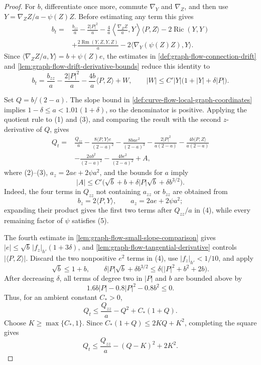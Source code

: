 \begin{proof}
For $b$, differentiate once more, commute $\nabla_Y$ and $\nabla_Z$, and
then use $Y=\nabla_ZZ/a-\psi(Z)Z$.  Before estimating any term this gives
\begin{align*}
 b_t={}&\frac{b_{zz}}a-\frac{2|P|^2}a
 -\frac4a\left\langle\frac{\nabla_ZZ}{a},Y\right\rangle
             \langle P,Z\rangle
 -2\operatorname{Ric}(Y,Y)\\
 &+\frac{2\operatorname{Rm}(Y,Z,Y,Z)}a
 -2\langle\nabla_Y(\psi(Z)Z),Y\rangle.
\end{align*}
Since
$\langle\nabla_ZZ/a,Y\rangle=b+\psi(Z)e$, the estimates in
\ref{def:graph-flow-connection-drift} and
\ref{lem:graph-flow-drift-derivative-bounds} reduce this identity to
\[
b_t=\frac{b_{zz}}a-\frac{2|P|^2}a
       -\frac{4b}{a}\langle P,Z\rangle+W,
 \qquad
 |W|\le C'|Y|\bigl(1+|Y|+\delta|P|\bigr).           \tag{3}
\]

Set $Q=b/(2-a)$.  The slope bound in
\ref{def:curve-flow-local-graph-coordinates} implies
$1-\delta\le a<1.01(1+\delta)$, so the denominator is positive.  Applying
the quotient rule to (1) and (3), and comparing the result with the second
$z$-derivative of $Q$, gives
\begin{align*}
 Q_t={}&\frac{Q_{zz}}a
 -\frac{8\langle P,Y\rangle e}{(2-a)^2}
 -\frac{8ba e^2}{(2-a)^3}
 -\frac{2|P|^2}{a(2-a)}
 -\frac{4b\langle P,Z\rangle}{a(2-a)}\\
 &-\frac{2ab^2}{(2-a)^2}
 -\frac{4be^2}{(2-a)^2}+A,                          \tag{4}
\end{align*}
where (2)--(3), $a_z=2ae+2\psi a^2$, and the bounds for $a$ imply
\[
|A|\le C'\bigl(\sqrt b+b+\delta |P|\sqrt b+\delta b^{3/2}\bigr).\tag{5}
\]
Indeed, the four terms in $Q_{zz}$ not containing $a_{zz}$ or $b_{zz}$
are obtained from
\[
 b_z=2\langle P,Y\rangle,
 \qquad a_z=2ae+2\psi a^2;
\]
expanding their product gives the first two terms after $Q_{zz}/a$ in
(4), while every remaining factor of $\psi$ satisfies (5).

The fourth estimate in \ref{lem:graph-flow-small-slope-comparison} gives
$|e|\le\sqrt b\,|f_z|_{h'}(1+3\delta)$, and
\ref{lem:graph-flow-tangential-derivative} controls
$|\langle P,Z\rangle|$.  Discard the two nonpositive $e^2$ terms in
(4), use $|f_z|_{h'}<1/10$, and apply
\[
\sqrt b\le 1+b,
 \qquad
\delta |P|\sqrt b+\delta b^{3/2}
 \le \delta\bigl(|P|^2+b^2+2b\bigr).
\]
After decreasing $\delta$, all terms of degree two in $|P|$ and $b$ are
bounded above by
\[
 1.6b|P|-0.8|P|^2-0.8b^2\le0.
\]
Thus, for an ambient constant $C_*>0$,
\[
 Q_t\le\frac{Q_{zz}}a-Q^2+C_*(1+Q).
\]
Choose $K\ge\max\{C_*,1\}$.  Since
$C_*(1+Q)\le2KQ+K^2$, completing the square gives
\[
 Q_t\le\frac{Q_{zz}}a-(Q-K)^2+2K^2.                            \tag{6}
\]


\end{proof}
